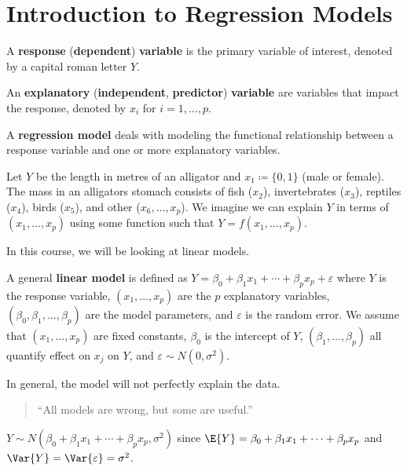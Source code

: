 \section{Introduction to Regression Models}
\begin{definition}
    A \textbf{response} (\textbf{dependent})
    \textbf{variable} is the primary variable
    of interest, denoted by a capital
    roman letter $ Y $.
\end{definition}
\begin{definition}
    An \textbf{explanatory} (\textbf{independent}, \textbf{predictor})
    \textbf{variable} are variables that
    impact the response, denoted by $ x_i $
    for $ i=1,\ldots,p $.
\end{definition}
\begin{definition}
    A \textbf{regression model}
    deals with modeling the functional relationship between a response
    variable and one or more explanatory variables.
\end{definition}
\begin{example}
    Let $ Y $ be the length in metres of an alligator
    and $ x_1\coloneq \{0,1\} $ (male or female).
    The mass in an alligators stomach consists of
    fish ($ x_2 $), invertebrates ($ x_3 $),
    reptiles ($ x_4 $), birds ($ x_5 $),
    and other ($ x_6,\ldots,x_p $).
    We imagine we can explain $ Y $ in terms
    of $ (x_1,\ldots,x_p) $ using some function
    such that $ Y=f(x_1,\ldots,x_p) $.
\end{example}
In this course, we will be looking at linear models.
\begin{definition}
    A general \textbf{linear model} is defined as
    $ Y=\beta_0+\beta_1x_1+\cdots+\beta_p x_p+\varepsilon $
    where $ Y $ is the response variable, $ (x_1,\ldots,x_p) $
    are the $ p $ explanatory variables,
    $ (\beta_0,\beta_1,\ldots,\beta_p) $
    are the model parameters, and $ \varepsilon $
    is the random error. We assume
    that $ (x_1,\ldots,x_p) $ are fixed constants,
    $ \beta_0 $ is the intercept of $ Y $,
    $ (\beta_1,\ldots,\beta_p) $ all quantify effect on $ x_j $
    on $ Y $, and $ \varepsilon \sim N(0,\sigma^2) $.
\end{definition}
\begin{remark}
    In general, the model will not perfectly explain the data.
    \begin{quote}
        ``All models are wrong, but some are useful.''
    \end{quote}
\end{remark}
$ Y \sim N\left(\beta_0+\beta_1x_1+\cdots+\beta_p x_p,\sigma^2\right) $
since $ \E{Y}=\beta_0+\beta_1x_1+\cdots+\beta_p x_p $ and
$ \Var{Y}=\Var{\varepsilon}=\sigma^2 $.
